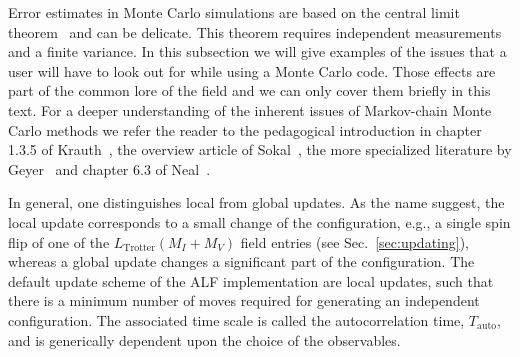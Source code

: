 %

Error estimates in Monte Carlo simulations are based on the central limit theorem~\cite{Negele} and can be delicate. This theorem requires independent 
measurements and  a finite variance.
In this subsection we will give examples of the issues that a user will have to look out for while 
using a Monte Carlo code. Those effects are part of the common lore of the field
and we can only cover them briefly in this text.
For a deeper understanding of the inherent issues of Markov-chain Monte Carlo methods 
we refer the reader to the pedagogical introduction in chapter 1.3.5 of Krauth~\cite{Krauth2006}, the overview article of Sokal~\cite{Sokal89},  the more specialized literature by Geyer~\cite{Geyer1992} and chapter 6.3 of Neal~\cite{neal1993}.

In general, one distinguishes local from global updates. As the name suggest, the local update corresponds to a small change of the configuration, e.g., a single spin flip of one of the $L_{\mathrm{Trotter}}(M_I+M_V)$ field entries (see Sec.~\ref{sec:updating}), whereas a global update changes a significant part of the configuration. The default update scheme of the ALF implementation are local updates, such that there is a minimum number of moves required for generating an independent configuration. The associated time scale is called  the autocorrelation time, $T_\mathrm{auto}$, and is generically dependent upon the choice of the observables. 

